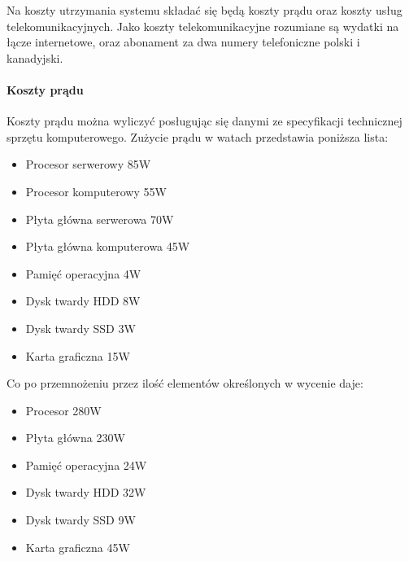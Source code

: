 \par Na koszty utrzymania systemu składać się będą koszty prądu oraz koszty usług telekomunikacyjnych. Jako koszty telekomunikacyjne rozumiane są wydatki na łącze internetowe, oraz abonament za dwa numery telefoniczne polski i kanadyjski.
		
			\paragraph{Koszty prądu}
				\par Koszty prądu można wyliczyć posługując się danymi ze specyfikacji technicznej sprzętu komputerowego. Zużycie prądu w watach przedstawia poniższa lista:

				\begin{itemize}
					\item{Procesor serwerowy} 85W
			 
                    \item{Procesor komputerowy} 55W
			 
					\item{Płyta główna serwerowa} 70W
			
                    \item{Płyta główna komputerowa} 45W
			
					\item{Pamięć operacyjna} 4W
			
					\item{Dysk twardy HDD} 8W
			
					\item{Dysk twardy SSD} 3W
			
					\item{Karta graficzna} 15W
				\end{itemize}

				\par Co po przemnożeniu przez ilość elementów określonych w wycenie daje:
				
				\begin{itemize}
					\item{Procesor} 280W
			 
					\item{Płyta główna} 230W
			
					\item{Pamięć operacyjna} 24W
			
					\item{Dysk twardy HDD} 32W
			
					\item{Dysk twardy SSD} 9W
			
					\item{Karta graficzna} 45W
				\end{itemize}
				
